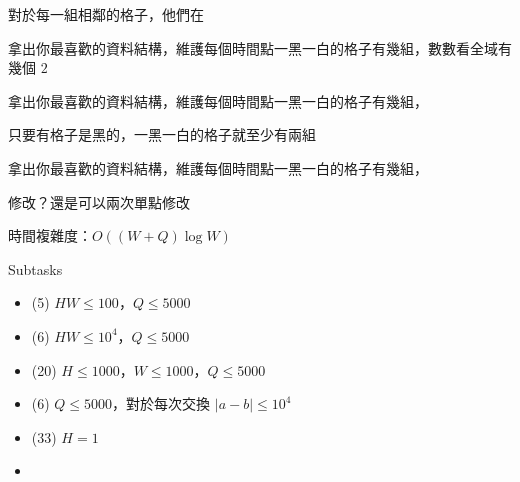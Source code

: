 \begin{frame}{}
    對於每一組相鄰的格子，他們在

     {
        拿出你最喜歡的資料結構，維護每個時間點一黑一白的格子有幾組，數數看全域有幾個 $2$
    }

     {
        拿出你最喜歡的資料結構，維護每個時間點一黑一白的格子有幾組，
    }

     {
        只要有格子是黑的，一黑一白的格子就至少有兩組

        拿出你最喜歡的資料結構，維護每個時間點一黑一白的格子有幾組，
    }
\end{frame}

\begin{frame}{}
    修改？還是可以兩次單點修改

    時間複雜度：$O((W + Q) \log W)$
\end{frame}

\begin{frame}{}
    \begin{problem}
        Subtasks

        \begin{itemize}
            \item (5) $HW \le 100$，$Q \le 5000$
            \item (6) $HW \le 10^4$，$Q \le 5000$
            \item (20) $H \le 1000$，$W \le 1000$，$Q \le 5000$
            \item (6) $Q \le 5000$，對於每次交換 $|a - b| \le 10^4$
            \item (33) $H = 1$
            \item {}
        \end{itemize}
    \end{problem}

\end{frame}

